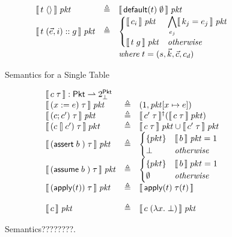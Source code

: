 \begin{figure}[ht]
  \[\begin{array}{lcl}
      \llbracket\,t\; \langle\rangle\,\rrbracket\; \mathit{pkt}
      &\triangleq& \llbracket\,\mathsf{default}(t)\; \emptyset\,\rrbracket\; \mathit{pkt} \\
      \llbracket\, t\; (\vec e, i)::g\,\rrbracket\; \mathit{pkt}
      &\triangleq& \begin{cases}
        \llbracket\,c_i\,\rrbracket\; \mathit{pkt} & \displaystyle \bigwedge_{e_j} \llbracket\,k_j = e_j\,\rrbracket\; \mathit{pkt} \\
        \llbracket\,t\; g\,\rrbracket\; \mathit{pkt} & \mathit{otherwise}
      \end{cases}\\
      && \mathit{where}\; t = (s, \vec k, \vec c, c_d)
    \end{array}\]
  \caption{Semantics for a Single Table}
  \label{fig:tablesemantics}
\end{figure}


\begin{figure}[ht]
  \[\begin{array}{lcl}
      \multicolumn 3 l {\bracbb{c\; \tau} : \Pkt \rightharpoonup 2^\Pkt_\bot} \\
      \bracbb{(x:=e)\; \tau}\; \pkt & \triangleq & (1,\pkt[x \mapsto e]) \\
      \bracbb{(c;c')\; \tau}\; \pkt & \triangleq & \bracbb{c'\; \tau}^\dag(\bracbb{c\; \tau}\; pkt) \\
      \bracbb{(c\angel c')\; \tau}\; pkt &\triangleq& \bracbb{c\; \tau}\; \pkt \cup \bracbb{c'\; \tau}\; \pkt \\
      \bracbb{(\assert b)\; \tau}\; \pkt &\triangleq& \begin{cases}
        \{pkt\}   & \bracbb{b}\; \pkt = \TRUE \\
        \bot & \mathit{otherwise}
      \end{cases} \\
      \bracbb{(\assume b)\; \tau}\; \pkt &\triangleq& \begin{cases}
        \{pkt\} & \bracbb{b}\; pkt = \TRUE \\
        \emptyset    & \mathit{otherwise}
      \end{cases} \\
      \bracbb{(\apply t)\; \tau}\; \pkt &\triangleq& \bracbb{\apply t\; \tau(t)} \\\\
      \bracbb c \; \pkt & \triangleq& \bracbb{c\; (\lambda x. \;\bot)}\; \pkt

    \end{array}\]
  
  \caption{Semantics????????. }
  \label{fig:semantics}

\end{figure}


